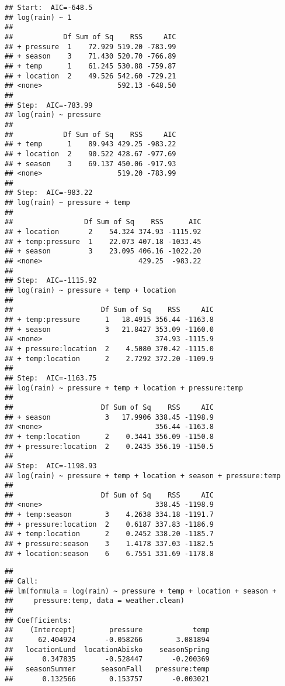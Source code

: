 \documentclass[]{article}
\begin{document}
\begin{verbatim}
## Start:  AIC=-648.5
## log(rain) ~ 1
## 
##            Df Sum of Sq    RSS     AIC
## + pressure  1    72.929 519.20 -783.99
## + season    3    71.430 520.70 -766.89
## + temp      1    61.245 530.88 -759.87
## + location  2    49.526 542.60 -729.21
## <none>                  592.13 -648.50
## 
## Step:  AIC=-783.99
## log(rain) ~ pressure
## 
##            Df Sum of Sq    RSS     AIC
## + temp      1    89.943 429.25 -983.22
## + location  2    90.522 428.67 -977.69
## + season    3    69.137 450.06 -917.93
## <none>                  519.20 -783.99
## 
## Step:  AIC=-983.22
## log(rain) ~ pressure + temp
## 
##                 Df Sum of Sq    RSS      AIC
## + location       2    54.324 374.93 -1115.92
## + temp:pressure  1    22.073 407.18 -1033.45
## + season         3    23.095 406.16 -1022.20
## <none>                       429.25  -983.22
## 
## Step:  AIC=-1115.92
## log(rain) ~ pressure + temp + location
## 
##                     Df Sum of Sq    RSS     AIC
## + temp:pressure      1   18.4915 356.44 -1163.8
## + season             3   21.8427 353.09 -1160.0
## <none>                           374.93 -1115.9
## + pressure:location  2    4.5080 370.42 -1115.0
## + temp:location      2    2.7292 372.20 -1109.9
## 
## Step:  AIC=-1163.75
## log(rain) ~ pressure + temp + location + pressure:temp
## 
##                     Df Sum of Sq    RSS     AIC
## + season             3   17.9906 338.45 -1198.9
## <none>                           356.44 -1163.8
## + temp:location      2    0.3441 356.09 -1150.8
## + pressure:location  2    0.2435 356.19 -1150.5
## 
## Step:  AIC=-1198.93
## log(rain) ~ pressure + temp + location + season + pressure:temp
## 
##                     Df Sum of Sq    RSS     AIC
## <none>                           338.45 -1198.9
## + temp:season        3    4.2638 334.18 -1191.7
## + pressure:location  2    0.6187 337.83 -1186.9
## + temp:location      2    0.2452 338.20 -1185.7
## + pressure:season    3    1.4178 337.03 -1182.5
## + location:season    6    6.7551 331.69 -1178.8
\end{verbatim}

\begin{verbatim}
## 
## Call:
## lm(formula = log(rain) ~ pressure + temp + location + season + 
##     pressure:temp, data = weather.clean)
## 
## Coefficients:
##    (Intercept)        pressure            temp  
##      62.404924       -0.058266        3.081894  
##   locationLund  locationAbisko    seasonSpring  
##       0.347835       -0.528447       -0.200369  
##   seasonSummer      seasonFall   pressure:temp  
##       0.132566        0.153757       -0.003021
\end{verbatim}
\end{document}
